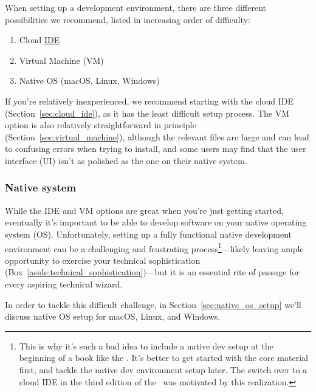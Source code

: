 When setting up a development environment, there are three different possibilities we recommend, listed in increasing order of difficulty:

\begin{enumerate}
  \item Cloud \href{https://en.wikipedia.org/wiki/Integrated_development_environment}{IDE}
  \item Virtual Machine (VM)
  \item Native OS (macOS, Linux, Windows)
\end{enumerate}

If you're relatively inexperienced, we recommend starting with the cloud IDE (Section~\ref{sec:cloud_ide}), as it has the least difficult setup process. The VM option is also relatively straightforward in principle (Section~\ref{sec:virtual_machine}), although the relevant files are large and can lead to confusing errors when trying to install, and some users may find that the user interface (UI) isn't as polished as the one on their native system.

\subsubsection{Native system} %
\label{sec:native_system}

While the IDE and VM options are great when you're just getting started, eventually it's important to be able to develop software on your native operating system (OS)\@. Unfortunately, setting up a fully functional native development environment can be a challenging and frustrating process\footnote{This is why it's such a bad idea to include a native dev setup at the beginning of a book like the \rortb. It's better to get started with the core material first, and tackle the native dev environment setup later. The switch over to a cloud IDE in the third edition of the \rortb\ was motivated by this realization.}---likely leaving ample opportunity to exercise your technical sophistication (Box~\ref{aside:technical_sophistication})---but it is an essential rite of passage for every aspiring technical wizard.

In order to tackle this difficult challenge, in Section~\ref{sec:native_os_setup} we'll discuss native OS setup for macOS, Linux, and Windows.

